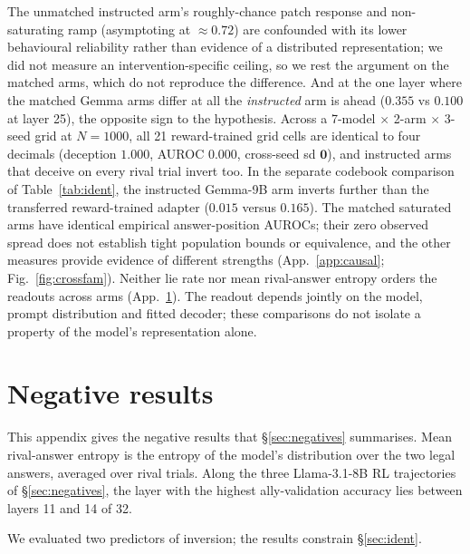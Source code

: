 \documentclass{article}
\begin{document}
The unmatched instructed arm's roughly-chance patch response and non-saturating ramp
(asymptoting at ${\approx}0.72$) are confounded with its lower behavioural reliability rather than
evidence of a distributed representation; we did not measure an intervention-specific ceiling, so we rest
the argument on the matched arms, which do not reproduce the difference. And at the one layer where
the matched Gemma arms differ at all the \emph{instructed} arm is ahead ($0.355$ vs $0.100$ at layer 25), the opposite sign to the hypothesis. Across a 7-model $\times$ 2-arm $\times$ 3-seed grid at $N{=}1000$, all
21 reward-trained grid cells are identical to four decimals (deception $1.000$, AUROC $0.000$, cross-seed sd
$\mathbf{0}$), and instructed arms that deceive on every rival trial invert too. In the separate codebook comparison of Table~\ref{tab:ident}, the instructed Gemma-9B arm inverts further than the transferred reward-trained adapter ($0.015$ versus
$0.165$). The matched saturated arms have identical empirical answer-position AUROCs; their zero observed spread does not establish tight population bounds or equivalence, and the other measures provide evidence of different strengths (App.~\ref{app:causal}; Fig.~\ref{fig:crossfam}). Neither lie rate nor mean rival-answer entropy orders the readouts across arms
(App.~\ref{app:negatives}). The readout depends jointly on the model, prompt distribution and fitted decoder; these comparisons do not isolate a property of the model's representation alone.

\section{Negative results}
\label{app:negatives}

This appendix gives the negative results that \S\ref{sec:negatives} summarises. Mean rival-answer entropy is the entropy of the model's distribution over the two legal answers, averaged over rival trials. Along the three Llama-3.1-8B RL trajectories of \S\ref{sec:negatives}, the layer with the highest ally-validation accuracy lies between layers 11 and 14 of 32.

We evaluated two predictors of inversion; the results constrain \S\ref{sec:ident}.
\end{document}
